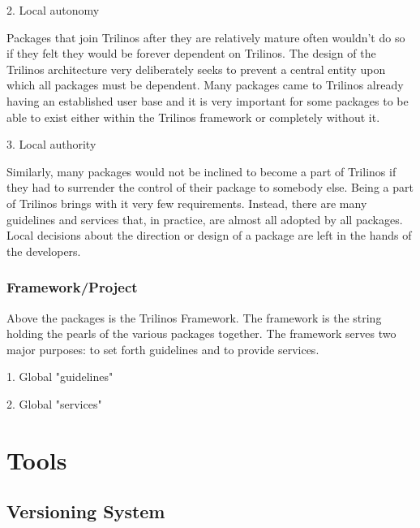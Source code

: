 \documentclass[12pt,relax]{article}
\begin{document}
  2. Local autonomy
    
  Packages that join Trilinos after they are relatively mature often wouldn't
  do so if they felt they would be forever dependent on Trilinos.  The design
  of the Trilinos architecture very deliberately seeks to prevent a central
  entity upon which all packages must be dependent.  Many packages came to 
  Trilinos already having an established user base and it is very important
  for some packages to be able to exist either within the Trilinos framework
  or completely without it.
  
  3. Local authority
  
  Similarly, many packages would not be inclined to become a part of Trilinos
  if they had to surrender the control of their package to somebody else.
  Being a part of Trilinos brings with it very few requirements.  Instead,
  there are many guidelines and services that, in practice, are almost all
  adopted by all packages.  Local decisions about the direction or design of
  a package are left in the hands of the developers.

  \subsubsection{Framework/Project}
  
  Above the packages is the Trilinos Framework.  The framework is the string
  holding the pearls of the various packages together.  The framework serves
  two major purposes:  to set forth guidelines and to provide services.
  
  1. Global "guidelines"
  
  2. Global "services"
  


\clearpage


\section{Tools}
\label{Section:Tools}

\subsection{Versioning System}
\end{document}

